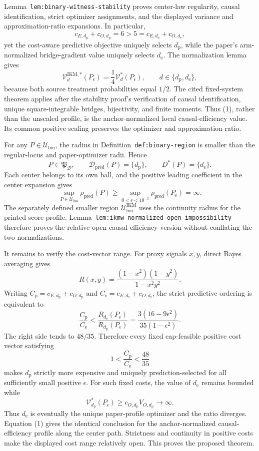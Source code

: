 Lemma~\texttt{lem:binary-witness-stability} proves center-law regularity, causal identification, strict optimizer assignments, and the displayed variance and approximation-ratio expansions. In particular,
\[
 c_{E,d_{\mathrm p}}+c_{O,d_{\mathrm p}}=6>5
 =c_{E,d_{\mathrm e}}+c_{O,d_{\mathrm e}},
\]
yet the cost-aware predictive objective uniquely selects \(d_{\mathrm p}\), while the paper's arm-normalized bridge-gradient value uniquely selects \(d_{\mathrm e}\). The normalization lemma gives
\[
 \mathcal V_d^{\mathrm{IKM},*}(P_\epsilon)
 =\frac14\mathcal V_d^*(P_\epsilon),
 \qquad d\in\{d_{\mathrm p},d_{\mathrm e}\}, \tag{1}
\]
because both source treatment probabilities equal \(1/2\). The cited fixed-system theorem applies after the stability proof's verification of causal identification, unique square-integrable bridges, bijectivity, and finite moments. Thus (1), rather than the unscaled profile, is the anchor-normalized local causal-efficiency value. Its common positive scaling preserves the optimizer and approximation ratio.

For any \(P\in\mathcal U_{\mathrm{bin}}\), the radius in Definition~\texttt{def:binary-region} is smaller than the regular-locus and paper-optimizer radii. Hence
\[
 P\in\mathfrak P_{\mathcal D},\qquad
 \mathcal D_{\mathrm{pred}}(P)=\{d_{\mathrm p}\},
 \qquad D^*(P)=\{d_{\mathrm e}\}.
\]
Each center belongs to its own ball, and the positive leading coefficient in the center expansion gives
\[
 \sup_{P\in\mathcal U_{\mathrm{bin}}}\rho_{\mathrm{pred}}(P)
 \ge\sup_{0<\epsilon<10^{-3}}\rho_{\mathrm{pred}}(P_\epsilon)
 =\infty. \tag{2}
\]
The separately defined smaller region \(\mathcal U_{\mathrm{bin}}^{\mathrm{IKM}}\) uses the continuity radius for the printed-score profile. Lemma~\texttt{lem:ikmw-normalized-open-impossibility} therefore proves the relative-open causal-efficiency version without conflating the two normalizations.

It remains to verify the cost-vector range. For proxy signals \(x,y\), direct Bayes averaging gives
\[
 R(x,y)=\frac{(1-x^2)(1-y^2)}{1-x^2y^2}.
\]
Writing \(C_{\mathrm p}=c_{E,d_{\mathrm p}}+c_{O,d_{\mathrm p}}\) and \(C_{\mathrm e}=c_{E,d_{\mathrm e}}+c_{O,d_{\mathrm e}}\), the strict predictive ordering is equivalent to
\[
 \frac{C_{\mathrm p}}{C_{\mathrm e}}
 <\frac{R_{d_{\mathrm e}}(P_\epsilon)}{R_{d_{\mathrm p}}(P_\epsilon)}
 =\frac{3(16-9\epsilon^2)}{35(1-\epsilon^2)}. \tag{3}
\]
The right side tends to \(48/35\). Therefore every fixed cap-feasible positive cost vector satisfying
\[
 1<\frac{C_{\mathrm p}}{C_{\mathrm e}}<\frac{48}{35}
\]
makes \(d_{\mathrm p}\) strictly more expensive and uniquely prediction-selected for all sufficiently small positive \(\epsilon\). For such fixed costs, the value of \(d_{\mathrm e}\) remains bounded while
\[
 \mathcal V_{d_{\mathrm p}}^*(P_\epsilon)
 \ge c_{O,d_{\mathrm p}}V_{O,d_{\mathrm p}}\longrightarrow\infty.
\]
Thus \(d_{\mathrm e}\) is eventually the unique paper-profile optimizer and the ratio diverges. Equation (1) gives the identical conclusion for the anchor-normalized causal-efficiency profile along the center path. Strictness and continuity in positive costs make the displayed cost range relatively open. This proves the proposed theorem.